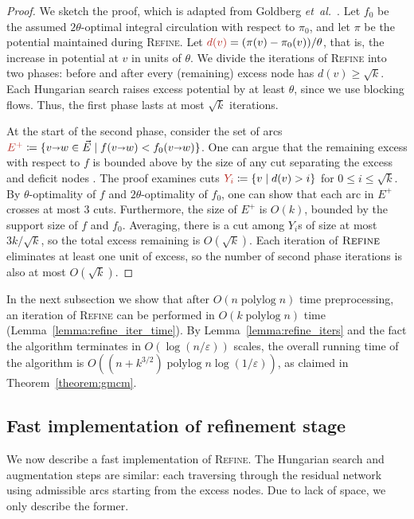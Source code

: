 \documentclass[a4paper,UKenglish]{socg-lipics-v2019}
\def\etal{\emph{et~al.}}
\def\etal{\textit{et~al.}}
\def\polylog{\mathop{\mathrm{polylog}}}
\def\eps{\varepsilon}
\def\arcto{\mathord\shortrightarrow}
\def\arc#1#2{#1\arcto#2}
\theoremstyle{plain}
\numberwithin{figure}{section}
\def\EMPH#1{\textcolor{BrickRed}{{\emph{#1}}}}
\begin{document}
\begin{proof}
We sketch the proof, which is adapted from Goldberg \etal~\cite{GHKT17}.
Let $f_0$ be the assumed $2\theta$-optimal integral circulation with respect to $\pi_0$,
and let $\pi$ be the potential maintained during \textsc{Refine}.
Let $\EMPH{$d(v)$} = (\pi(v) - \pi_0(v))/\theta$, that is, the increase in potential
at $v$ in units of $\theta$.
We divide the iterations of \textsc{Refine} into two phases: before and after
every (remaining) excess node has $d(v) \geq \sqrt{k}$.
Each Hungarian search raises excess potential by at least $\theta$,
since we use blocking flows.
Thus, the first phase lasts at most $\sqrt{k}$ iterations.

At the start of the second phase, consider the set of arcs
$\EMPH{$E^+$} \coloneqq \{\arc vw \in \vec{E} \mid f(\arc vw) < f_0(\arc vw)\}$.
One can argue that the remaining excess with respect to $f$ is bounded above by
the size of any cut separating the excess and deficit nodes \cite[Lemma~4]{GHKT17}.
The proof examines cuts $\EMPH{$Y_i$} \coloneqq \{v \mid d(v) > i\}$ for $0 \leq i \leq \sqrt{k}$.
By $\theta$-optimality of $f$ and $2\theta$-optimality of $f_0$, one can show
that each arc in $E^+$ crosses at most 3 cuts.
Furthermore, the size of $E^+$ is $O(k)$, bounded by the support size of $f$ and $f_0$.
Averaging, there is a cut among $Y_i$s of size at most $3k/\sqrt{k}$,
so the total excess remaining is $O(\sqrt{k})$.
Each iteration of $\textsc{Refine}$ eliminates at least one unit of excess,
so the number of second phase iterations is also at most $O(\sqrt{k})$.
\end{proof}

In the next subsection we show that after $O(n\polylog n)$ time preprocessing,
an iteration of \textsc{Refine} can be performed in $O(k\polylog n)$ time
(Lemma~\ref{lemma:refine_iter_time}).
By Lemma~\ref{lemma:refine_iters} and the fact the algorithm terminates in
$O(\log(n/\eps))$ scales, the overall running time of the algorithm is
$O((n + k^{3/2})\polylog n \log(1/\eps))$, as claimed in Theorem~\ref{theorem:gmcm}.

\subsection{Fast implementation of refinement stage}
\label{SS:fast_refine}

We now describe a fast implementation of \textsc{Refine}.
The Hungarian search and augmentation steps are similar:
each traversing through the residual network using admissible arcs starting
from the excess nodes.
Due to lack of space, we only describe the former.
\end{document}

